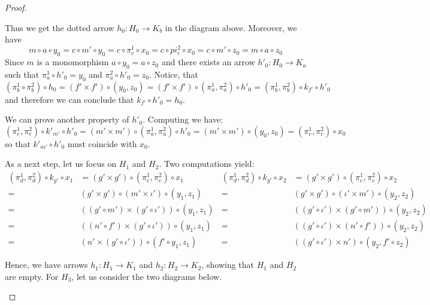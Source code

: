 \documentclass[a4paper,UKenglish,cleveref,pdftex,thm-restate,numberwithinsect]{lipics-v2021}
\begin{document}
\begin{proof}
\begin{enumerate}
 Thus we get the dotted arrow $h_0\colon H_0\to K_b$ in the diagram above. Moreover, we have
 \[m\circ a\circ y_0=c\circ m'\circ y_0=c\circ \pi^1_c\circ x_0=c\circ pi^2_c\circ x_0=c\circ m'\circ z_0=m\circ a \circ z_0\]
 Since $m$ is a monomorphism $a\circ y_0=a\circ z_0$ and there exists an arrow $h'_0\colon H_0\to K_a$ such that $\pi^1_a\circ h'_0=y_0$ and $\pi^2_a\circ h'_0=z_0$. Notice, that
 \[(\pi^1_b\circ \pi^2_b)\circ h_0=(f'\times f')\circ (y_0, z_0)=(f'\times f')\circ (\pi^1_a, \pi^2_a)\circ h'_0=(\pi^1_b, \pi^2_b)\circ k_{f'}\circ h'_0\]
and therefore we can conclude that $k_{f'}\circ h'_0=h_0$.

We can prove another property of $h'_0$. Computing we have:
\[(\pi^1_c, \pi^2_c)\circ k'_{m'}\circ h'_0=(m'\times m')\circ (\pi^1_a, \pi^2_a)\circ h'_0=(m'\times m')\circ (y_0, z_0)=(\pi^1_c, \pi^2_c)\circ x_0\]
so that $k'_{m'}\circ h'_0$ must coincide with $x_0$.

As a next step, let us focus on $H_1$ and $H_2$. Two computations yield: \small
 \[\begin{split}
(\pi^1_d, \pi^2_d)\circ k_{g'}\circ x_1&=(g'\times g')\circ (\pi^1_c, \pi^2_c)\circ x_1\\=&(g'\times g')\circ (m'\times \iota')\circ (y_1, z_1)\\=&((g'\circ m') \times (g'\circ \iota'))\circ (y_1, z_1)\\=&((n'\circ f') \times (g'\circ \iota'))\circ (y_1, z_1)\\=&(n'\times  (g'\circ \iota'))\circ (f'\circ y_1, z_1)
 \end{split} \hspace{1pt} \begin{split}
 (\pi^1_d, \pi^2_d)\circ k_{g'}\circ x_2&=(g'\times g')\circ (\pi^1_c, \pi^2_c)\circ x_2\\=&(g'\times g')\circ ( \iota' \times m')\circ (y_2, z_2)\\=&((g'\circ \iota') \times (g'\circ m'))\circ (y_2, z_2)\\=&( (g'\circ \iota') \times (n'\circ f'))\circ (y_2, z_2)\\=&((g'\circ \iota') \times n')\circ (y_2, f'\circ z_2)
 \end{split} \]
\normalsize

 Hence, we have arrows $h_1\colon H_1\to K_1$ and $h_2\colon H_2\to K_2$, showing that $H_1$ and $H_2$ are empty. For $H_3$, let us consider the two diagrams below.


\end{enumerate}
\end{proof}
\end{document}
